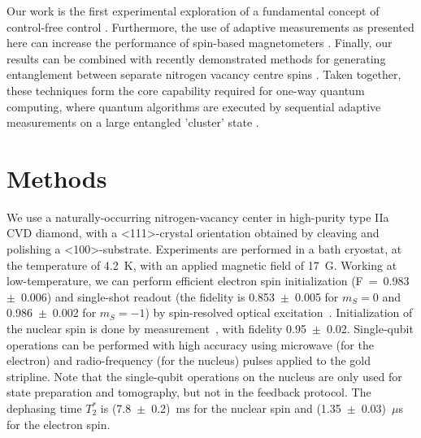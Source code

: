 Our work is the first experimental exploration of a fundamental concept of control-free control \cite{Jordan_PRB_2006, Ashhab_PhysRevA_2010, Wiseman_NatureNV_2011} . Furthermore, the use of adaptive measurements as presented here can increase the performance of spin-based magnetometers \cite{Cappellaro_PhysRevA_2012, Higgins_Nature_2007}. Finally, our results can be combined with recently demonstrated methods for generating entanglement between separate nitrogen vacancy centre spins \cite{Bernien_Nature_2013, Dolde_NatPhys_2013}. Taken together, these techniques form the core capability required for one-way quantum computing, where quantum algorithms are executed by sequential adaptive measurements on a large entangled 'cluster' state \cite{Raussendorf_PRL_2001, Prevedel_Nature_2007}.


\section{Methods}
We use a naturally-occurring nitrogen-vacancy center in high-purity type IIa CVD diamond, with a \textless 111\textgreater-crystal orientation obtained by cleaving and polishing a \textless100\textgreater -substrate. Experiments are performed in a bath cryostat, at the temperature of 4.2~K, with an applied magnetic field of 17~G. Working at low-temperature, we can perform efficient electron spin initialization (F~=~0.983~$\pm$~0.006) and single-shot readout (the fidelity is 0.853~$\pm$~0.005 for $m_S = 0$ and 0.986~$\pm$~0.002 for $m_S = -1$) by spin-resolved optical excitation~\cite{Robledo_Nature_2011}. Initialization of the nuclear spin is done by measurement~\cite{Robledo_Nature_2011}, with fidelity  0.95~$\pm$~0.02. Single-qubit operations can be performed with high accuracy using microwave (for the electron) and radio-frequency (for the nucleus) pulses applied to the gold stripline. Note that the single-qubit operations on the nucleus are only used for state preparation and tomography, but not in the feedback protocol. The dephasing time $T_2^*$ is (7.8~$\pm$~0.2)~ms for the nuclear spin and (1.35~$\pm$~0.03)~$\mu$s for the electron spin. 

